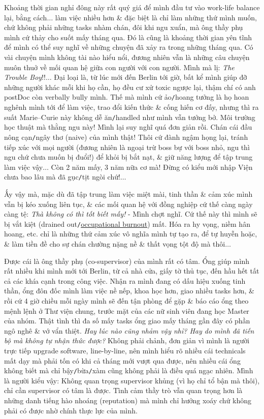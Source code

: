 \documentclass[12pt,twoside]{book}
\begin{document}
Khoảng thời gian nghỉ đông này rất quý giá để mình đầu tư vào work-life balance lại, bằng cách$\ldots$ làm việc nhiều hơn \& đặc biệt là chỉ làm những thứ mình muốn, chứ không phải những tasks nhàm chán, đôi khi ngu xuẩn, mà ông thầy phụ mình cứ thảy cho suốt mấy tháng qua. Đó là cũng là khoảng thời gian yên tĩnh để mình có thể suy nghĩ về những chuyện đã xảy ra trong những tháng qua. Có vài chuyện mình không tài nào hiểu nổi, đương nhiên vẫn là những câu chuyện muôn thuở về mối quan hệ giữa con người với con người. Mình mà lị: {\it The Trouble Boy}!!$\ldots$ Đại loại là, từ lúc mới đến Berlin tới giờ, bất kể mình giúp đỡ những người khác mỗi khi họ cần, họ đều cư xử toxic ngược lại, thậm chí có anh postDoc còn verbally bully mình. Thế mà mình cứ ảo{\tt/}hoang tưởng là họ hoan nghênh mình tới để làm việc, trao đổi kiến thức \& cống hiến cơ đấy, nhưng thì ra suất Marie--Curie này không dễ ăn{\tt/}handled như mình vẫn tưởng bở. Môi trường học thuật mà thằng ngu này! Mình lại suy nghĩ quá đơn giản rồi. Chán cái đầu nông cạn{\tt/}ngây thơ (naive) của mình thật! Thôi cứ đành ngậm họng lại, tránh tiếp xúc với mọi người (đương nhiên là ngoại trừ boss bự với boss nhỏ, ngu thì ngu chứ chưa muốn bị đuổi!) để khỏi bị bắt nạt, \& giữ năng lượng để tập trung làm việc vậy$\ldots$ Còn 2 năm mấy, 3 năm nữa cơ mà! Đừng có kiểu mới nhập Viện chưa bao lâu mà đã gục{\tt/}tịt ngòi chứ!$\ldots$

Ấy vậy mà, mặc dù đã tập trung làm việc miệt mài, tinh thần \& cảm xúc mình vẫn bị kéo xuống liên tục, \& các mối quan hệ với đồng nghiệp cứ thế càng ngày càng tệ: {\it Thà không có thì tốt biết mấy!} - Mình chợt nghĩ. Cứ thế này thì mình sẽ bị vắt kiệt (drained out{\tt/}\href{https://en.wikipedia.org/wiki/Occupational_burnout}{occupational burnout}) mất. Hóa ra hy vọng, niềm hân hoang, etc. chỉ là những thứ cảm xúc vô nghĩa mình tự tạo ra, để tự huyễn hoặc, \& làm tiền đề cho sự chán chường nặng nề \& thất vọng tột độ mà thôi$\ldots$

Được cái là ông thầy phụ (co-supervisor) của mình rất có tâm. Ổng giúp mình rất nhiều khi mình mới tới Berlin, từ cả nhà cửa, giấy tờ thủ tục, đến hầu hết tất cả các khía cạnh trong công việc. Nhận ra mình đang có dấu hiệu xuống tinh thần, ổng đôn đốc mình làm việc nề nếp, khoa học hơn, giao nhiều tasks hơn, \& rồi cứ 4 giờ chiều mỗi ngày mình sẽ đến tận phòng để gặp \& báo cáo ổng theo mệnh lệnh ở Thư viện chung, trước mặt của các nữ sinh viên đang học Master của nhóm. Thật tình thì đa số mấy tasks ổng giao mấy tháng gần đây có phần ngô nghê \& vớ vẩn thiệt. {\it Hay lúc nào cũng nhảm vậy nhỉ? Hay do mình đã tiến bộ mà không tự nhận thức được?} Không phải chảnh, đơn giản vì mình là người trực tiếp upgrade software, line-by-line, nên mình hiểu rõ nhiều cái technicals mất dạy mà phải tốn có khi cả tháng mới vượt qua được, nên nhiều cái ổng không biết mà chỉ bậy{\tt/}bừa{\tt/}xàm cũng không phải là điều quá ngạc nhiên. Mình là người kiểu vậy: Không quan trọng supervisor khủng (vì họ chỉ tổ bận mà thôi), chỉ cần supervisor có tâm là được. Tình cảm thầy trò vẫn quan trọng hơn là những danh tiếng hào nhoáng (reputation) mà mình chỉ hưởng xoáy chứ không phải có được nhờ chính thực lực của mình.
\end{document}
